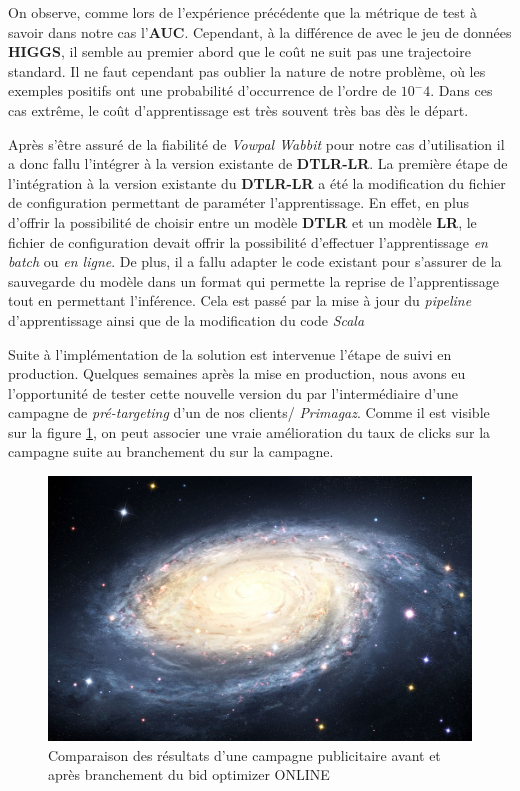         On observe, comme lors de l'expérience précédente que la métrique de test à savoir dans notre cas l'\textbf{AUC}. Cependant, à la différence de avec le jeu de données \textbf{HIGGS}, il semble au premier abord que le coût ne suit pas une trajectoire standard. Il ne faut cependant pas oublier la nature de notre problème, où les exemples positifs ont une probabilité d'occurrence de l'ordre de $10^-4$. Dans ces cas extrême, le coût d'apprentissage est très souvent très bas dès le départ. \par
        Après s'être assuré de la fiabilité de \emph{Vowpal Wabbit} pour notre cas d'utilisation il a donc fallu l'intégrer à la version existante de \textbf{DTLR-LR}. La première étape de l'intégration à la version existante du \bo \textbf{DTLR-LR} a été la modification du fichier de configuration permettant de paraméter l'apprentissage. En effet, en plus d'offrir la possibilité de choisir entre un modèle \textbf{DTLR} et un modèle \textbf{LR}, le fichier de configuration devait offrir la possibilité d'effectuer l'apprentissage \emph{en batch} ou \emph{en ligne}. De plus, il a fallu adapter le code existant pour s'assurer de la sauvegarde du modèle dans un format qui permette la reprise de l'apprentissage tout en permettant l'inférence. Cela est passé par la mise à jour du \emph{pipeline} d'apprentissage ainsi que de la modification du code \emph{Scala} \par
        Suite à l'implémentation de la solution est intervenue l'étape de suivi en production. Quelques semaines après la mise en production, nous avons eu l'opportunité de tester cette nouvelle version du \bo par l'intermédiaire d'une campagne de \emph{pré-targeting} d'un de nos clients/ \emph{Primagaz}. Comme il est visible sur la figure \ref{fig:primagaz}, on peut associer une vraie amélioration du taux de clicks sur la campagne suite au branchement du \bo sur la campagne.
        \begin{figure}[h]
            \includegraphics[width=\linewidth]{images/universe.jpg}
            \caption{Comparaison des résultats d'une campagne publicitaire avant et après branchement du bid optimizer ONLINE}
            \label{fig:primagaz}
        \end{figure}
